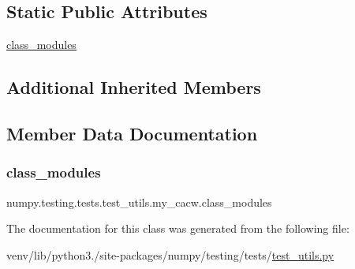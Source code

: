 \subsection*{Static Public Attributes}
\begin{DoxyCompactItemize}
\item 
\hyperlink{classnumpy_1_1testing_1_1tests_1_1test__utils_1_1my__cacw_a4e40dac6ea946ed3450d3be79796b6f8}{class\+\_\+modules}
\end{DoxyCompactItemize}
\subsection*{Additional Inherited Members}


\subsection{Member Data Documentation}
\mbox{\label{classnumpy_1_1testing_1_1tests_1_1test__utils_1_1my__cacw_a4e40dac6ea946ed3450d3be79796b6f8}} 
\subsubsection{\texorpdfstring{class\+\_\+modules}{class\_modules}}
{\footnotesize\ttfamily numpy.\+testing.\+tests.\+test\+\_\+utils.\+my\+\_\+cacw.\+class\+\_\+modules\hspace{0.3cm}{\ttfamily [static]}}



The documentation for this class was generated from the following file\+:\begin{DoxyCompactItemize}
\item 
venv/lib/python3./site-\/packages/numpy/testing/tests/\hyperlink{numpy_2testing_2tests_2test__utils_8py}{test\+\_\+utils.\+py}\end{DoxyCompactItemize}
